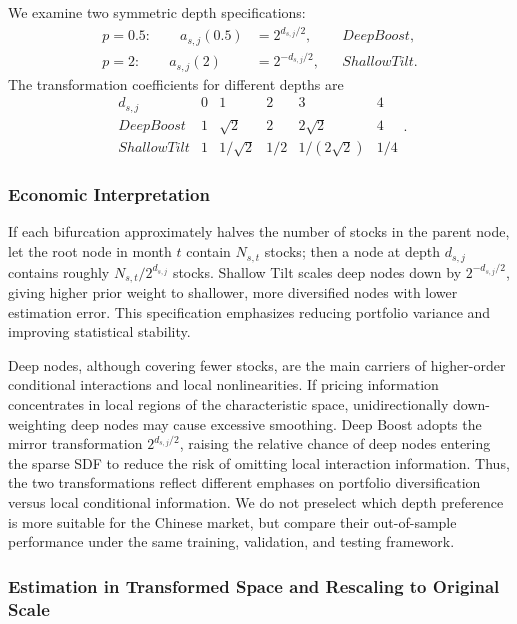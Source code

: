 \documentclass[12pt]{article}
\def\text#1{#1}%
\begin{document}
We examine two symmetric depth specifications:
\begin{align}
  p=0.5:\qquad
  a_{s,j}(0.5)
  &=2^{d_{s,j}/2},
  &&\text{Deep Boost},
  \label{eq:deep_boost}\\
  p=2:\qquad
  a_{s,j}(2)
  &=2^{-d_{s,j}/2},
  &&\text{Shallow Tilt}.
  \label{eq:shallow_tilt}
\end{align}
The transformation coefficients for different depths are
\begin{equation}
  \begin{array}{c|ccccc}
    d_{s,j} & 0 & 1 & 2 & 3 & 4 \\ \hline
    \text{Deep Boost}
    &1&\sqrt{2}&2&2\sqrt{2}&4\\
    \text{Shallow Tilt}
    &1&1/\sqrt{2}&1/2&1/(2\sqrt{2})&1/4
  \end{array}.
  \label{eq:depth_weight_table}
\end{equation}

\subsubsection{Economic Interpretation}

If each bifurcation approximately halves the number of stocks in the parent node, let the root node in month \(t\) contain \(N_{s,t}\) stocks; then a node at depth \(d_{s,j}\) contains roughly \(N_{s,t}/2^{d_{s,j}}\) stocks. Shallow Tilt scales deep nodes down by \(2^{-d_{s,j}/2}\), giving higher prior weight to shallower, more diversified nodes with lower estimation error. This specification emphasizes reducing portfolio variance and improving statistical stability.

Deep nodes, although covering fewer stocks, are the main carriers of higher-order conditional interactions and local nonlinearities. If pricing information concentrates in local regions of the characteristic space, unidirectionally down-weighting deep nodes may cause excessive smoothing. Deep Boost adopts the mirror transformation \(2^{d_{s,j}/2}\), raising the relative chance of deep nodes entering the sparse SDF to reduce the risk of omitting local interaction information. Thus, the two transformations reflect different emphases on portfolio diversification versus local conditional information. We do not preselect which depth preference is more suitable for the Chinese market, but compare their out-of-sample performance under the same training, validation, and testing framework.

\subsubsection{Estimation in Transformed Space and Rescaling to Original Scale}
\end{document}
